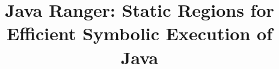 \documentclass[conference]{IEEEtran}
\begin{document}
\newcommand{\mike}[1]{\textcolor{red}{#1}}
\newcommand{\vaibhav}[1]{\textcolor{red}{#1}}
\newcommand{\soha}[1]{\textcolor{red}{#1}}
\newcommand{\smcc}[1]{\textcolor{red}{#1}}

\newcommand{\toolshort}{JR}
\newcommand{\tool}{Java Ranger}
\newcommand{\toolfull}{Java Ranger}

\title{\tool: Static Regions for Efficient Symbolic Execution of Java}

\end{document}
